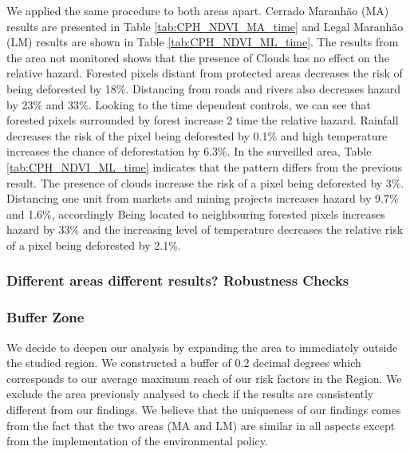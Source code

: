We applied the same procedure to both areas apart. Cerrado Maranhão (MA) results are presented in Table \ref{tab:CPH_NDVI_MA_time} and Legal Maranhão (LM) results are shown in Table \ref{tab:CPH_NDVI_ML_time}. The results from the area not monitored shows that the presence of Clouds has no effect on the relative hazard. Forested pixels distant from protected areas decreases the risk of being deforested by 18\%. Distancing from roads and rivers also decreases hazard by 23\% and 33\%. Looking to the time dependent controls, we can see that forested pixels surrounded by forest increase 2 time the relative hazard. Rainfall decreases the risk of the pixel being deforested by 0.1\% and high temperature increases the chance of deforestation by 6.3\%. 
In the surveilled area, Table \ref{tab:CPH_NDVI_ML_time} indicates that the pattern differs from the previous result. The presence of clouds increase the risk of a pixel being deforested by 3\%. Distancing one unit from markets and mining projects increases hazard by 9.7\% and 1.6\%, accordingly Being located to neighbouring forested pixels increases hazard by 33\% and the increasing level of temperature decreases the relative risk of a pixel being deforested by 2.1\%.

\subsubsection{Different areas different results? Robustness Checks} \label{resultssection2.1}

\subsubsection{Buffer Zone}
We decide to deepen our analysis by expanding the area to immediately outside the studied region. We constructed a buffer of 0.2 decimal degrees which corresponds to our average maximum reach of our risk factors in the Region. We exclude the area previously analysed to check if the results are consistently different from our findings. We believe that the uniqueness of our findings comes from the fact that the two areas (MA and LM) are similar in all aspects except from the implementation of the environmental policy. 

